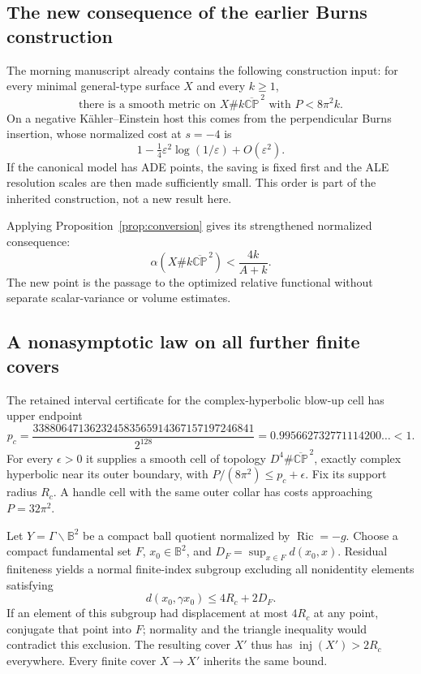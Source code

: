 \documentclass[11pt]{article}
\newcommand{\Ric}{\operatorname{Ric}}
\newcommand{\CP}{\mathbb{CP}}
\theoremstyle{definition}
\theoremstyle{remark}
\begin{document}
\subsection{The new consequence of the earlier Burns construction}

The morning manuscript already contains the following construction input:
for every minimal general-type surface $X$ and every $k\ge1$,
\begin{equation}
 \text{there is a smooth metric on }X\#k\overline{\CP}^{\,2}
 \text{ with }P<8\pi^2k.
 \label{eq:inherited-Burns}
\end{equation}
On a negative K\"ahler--Einstein host this comes from the perpendicular
Burns insertion, whose normalized cost at $s=-4$ is
\[
 1-\tfrac14\varepsilon^2\log(1/\varepsilon)+O(\varepsilon^2).
\]
If the canonical model has ADE points, the saving is fixed first and the
ALE resolution scales are then made sufficiently small. This order is
part of the inherited construction, not a new result here.

Applying Proposition~\ref{prop:conversion} gives its strengthened
normalized consequence:
\begin{equation}
 \boxed{\alpha(X\#k\overline{\CP}^{\,2})
               <\frac{4k}{A+k}.}
 \label{eq:strict-general-type-upper}
\end{equation}
The new point is the passage to the optimized relative functional without
separate scalar-variance or volume estimates.

\subsection{A nonasymptotic law on all further finite covers}
\label{sec:cover-law}

The retained interval certificate for the complex-hyperbolic blow-up cell
has upper endpoint
\begin{equation}
 p_c=\frac{338806471362324583565914367157197246841}{2^{128}}
       =0.995662732771114200\ldots<1.
 \label{eq:pc}
\end{equation}
For every $\epsilon>0$ it supplies a smooth cell of topology
$D^4\#\overline{\CP}^{\,2}$, exactly complex hyperbolic near its
outer boundary, with $P/(8\pi^2)\le p_c+\epsilon$.
Fix its support radius $R_c$. A handle cell with the same outer collar
has costs approaching $P=32\pi^2$.

Let $Y=\Gamma\backslash\mathbb B^2$ be a compact ball quotient normalized
by $\Ric=-g$. Choose a compact fundamental set $F$, $x_0\in\mathbb B^2$,
and $D_F=\sup_{x\in F}d(x_0,x)$. Residual finiteness yields a normal
finite-index subgroup excluding all nonidentity elements satisfying
\[
 d(x_0,\gamma x_0)\le4R_c+2D_F.
\]
If an element of this subgroup had displacement at most $4R_c$ at any
point, conjugate that point into $F$; normality and the triangle inequality
would contradict this exclusion. The resulting cover $X'$ thus has
$\operatorname{inj}(X')>2R_c$ everywhere. Every finite cover $X\to X'$
inherits the same bound.
\end{document}
